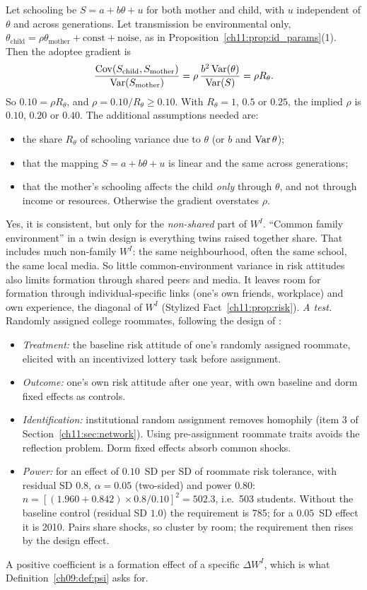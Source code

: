 \documentclass[../solutions_manual.tex]{subfiles}
\begin{document}
 Let schooling be $S = a + b\theta + u$ for both mother and child, with $u$ independent of $\theta$ and across generations. Let transmission be environmental only, $\theta_{\text{child}} = \rho\theta_{\text{mother}} + \text{const} + \text{noise}$, as in Proposition~\ref{ch11:prop:id_params}(1). Then the adoptee gradient is
\[
\frac{\operatorname{Cov}(S_{\text{child}}, S_{\text{mother}})}{\operatorname{Var}(S_{\text{mother}})} = \rho\,\frac{b^2\operatorname{Var}(\theta)}{\operatorname{Var}(S)} = \rho R_\theta .
\]
So $0.10 = \rho R_\theta$, and $\rho = 0.10/R_\theta \ge 0.10$. With $R_\theta = 1$, $0.5$ or $0.25$, the implied $\rho$ is $0.10$, $0.20$ or $0.40$. The additional assumptions needed are:
\begin{itemize}
\item the share $R_\theta$ of schooling variance due to $\theta$ (or $b$ and $\operatorname{Var}\theta$);
\item that the mapping $S = a + b\theta + u$ is linear and the same across generations;
\item that the mother's schooling affects the child \emph{only} through $\theta$, and not through income or resources. Otherwise the gradient overstates $\rho$.
\end{itemize}

 Yes, it is consistent, but only for the \emph{non-shared} part of $W^I$. ``Common family environment'' in a twin design is everything twins raised together share. That includes much non-family $W^I$: the same neighbourhood, often the same school, the same local media. So little common-environment variance in risk attitudes \citep{cesarini2009genetic} also limits formation through shared peers and media. It leaves room for formation through individual-specific links (one's own friends, workplace) and own experience, the diagonal of $W^I$ (Stylized Fact~\ref{ch11:prop:risk}). \textit{A test.} Randomly assigned college roommates, following the design of \citet{sacerdote2001peer}:
\begin{itemize}
\item \emph{Treatment:} the baseline risk attitude of one's randomly assigned roommate, elicited with an incentivized lottery task before assignment.
\item \emph{Outcome:} one's own risk attitude after one year, with own baseline and dorm fixed effects as controls.
\item \emph{Identification:} institutional random assignment removes homophily (item 3 of Section~\ref{ch11:sec:network}). Using pre-assignment roommate traits avoids the reflection problem. Dorm fixed effects absorb common shocks.
\item \emph{Power:} for an effect of $0.10$~SD per SD of roommate risk tolerance, with residual SD $0.8$, $\alpha = 0.05$ (two-sided) and power $0.80$: $n = [(1.960 + 0.842)\times 0.8/0.10]^2 = 502.3$, i.e.\ 503 students. Without the baseline control (residual SD $1.0$) the requirement is 785; for a $0.05$~SD effect it is 2010. Pairs share shocks, so cluster by room; the requirement then rises by the design effect.
\end{itemize}
A positive coefficient is a formation effect of a specific $\Delta W^I$, which is what Definition~\ref{ch09:def:psi} asks for.
\end{document}

